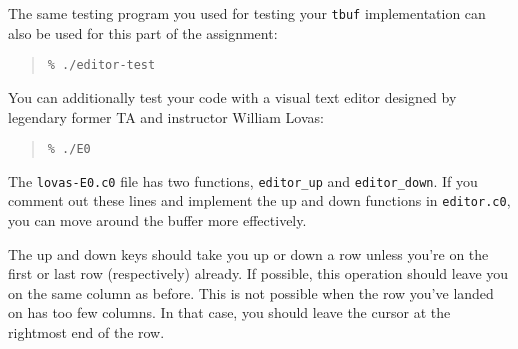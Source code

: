 \documentclass[12pt]{exam}
\begin{document}
The same testing program you used for testing your \lstinline'tbuf' implementation can also be used for this part of the assignment:
\begin{quote}
\begin{lstlisting}[language={[coin]C}]
% cc0 -d -w -o editor-test tbuf.c0 editor.c0 editor-test.c0 test-main.c0
% ./editor-test
\end{lstlisting}
\end{quote}
You can additionally test your code with a visual
text editor designed by legendary former TA and instructor William Lovas:
\begin{quote}
\begin{lstlisting}[language={[coin]C}]
% cc0 -d -w -o E0 tbuf.c0 editor.c0 lovas-E0.c0
% ./E0
\end{lstlisting}
\end{quote}

\begin{ectask}
The \lstinline'lovas-E0.c0' file has two functions,
\lstinline'editor_up' and \lstinline'editor_down'. If you comment out
these lines and implement the up and down functions in
\lstinline'editor.c0', you can move around the buffer more effectively.

The up and down keys should take you up or down a row unless you're on
the first or last row (respectively) already. If possible, this
operation should leave you on the same column as before.  This is not
possible when the row you've landed on has too few columns. In that
case, you should leave the cursor at the rightmost end of the row.
\end{ectask}
\end{document}
